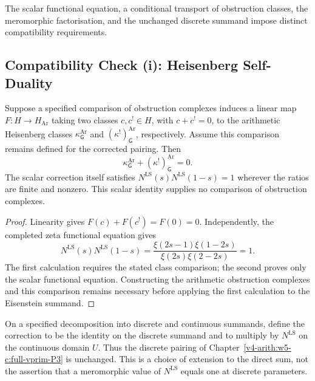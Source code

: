 The scalar functional equation, a conditional transport of obstruction
classes, the meromorphic factorisation, and the unchanged discrete
summand impose distinct compatibility requirements.

\subsection{Compatibility Check (i): Heisenberg Self-Duality}
\label{v4-arith:w6-c:LS:compat-koszul}

\begin{proposition}
\label{v4-arith:w6-c:prop:koszul-selfduality}
Suppose a specified comparison of obstruction complexes induces a
linear map \(F:H\to H_{\mathrm{Ar}}\) taking two classes
\(c,c^{!}\in H\), with \(c+c^{!}=0\), to the arithmetic Heisenberg
classes \(\kappa^{\mathrm{Ar}}_{\mathsf G}\) and
\((\kappa^{!})^{\mathrm{Ar}}_{\mathsf G}\), respectively.
Assume this comparison remains defined for the corrected pairing.
Then
\begin{equation}
\label{v4-arith:w6-c:eq:koszul-selfduality}
\kappa^{\mathrm{Ar}}_{\mathsf G}+(\kappa^{!})^{\mathrm{Ar}}_{\mathsf G}=0.
\end{equation}
The scalar correction itself satisfies
\(N^{\mathrm{LS}}(s)N^{\mathrm{LS}}(1-s)=1\) wherever the ratios
are finite and nonzero. This scalar identity supplies no comparison
of obstruction complexes.
\end{proposition}
\begin{proof}
Linearity gives \(F(c)+F(c^{!})=F(0)=0\). Independently, the completed
zeta functional equation gives
\[
 N^{\mathrm{LS}}(s)N^{\mathrm{LS}}(1-s)
 =\frac{\xi(2s-1)\xi(1-2s)}{\xi(2s)\xi(2-2s)}=1.
\]
The first calculation requires the stated class comparison; the
second proves only the scalar functional equation. Constructing the
arithmetic obstruction complexes and this comparison remains necessary
before applying the first calculation to the Eisenstein summand.
\end{proof}

\begin{remark}
\label{v4-arith:w6-c:rem:discrete-untouched}
On a specified decomposition into discrete and continuous summands,
define the correction to be the identity on the discrete summand and
to multiply by \(N^{\mathrm{LS}}\) on the continuous domain \(U\).
Thus the discrete pairing of
Chapter~\ref{v4-arith:w5-c:full-vprim-P3} is unchanged. This is a
choice of extension to the direct sum, not the assertion that a
meromorphic value of \(N^{\mathrm{LS}}\) equals one at discrete parameters.
\end{remark}

